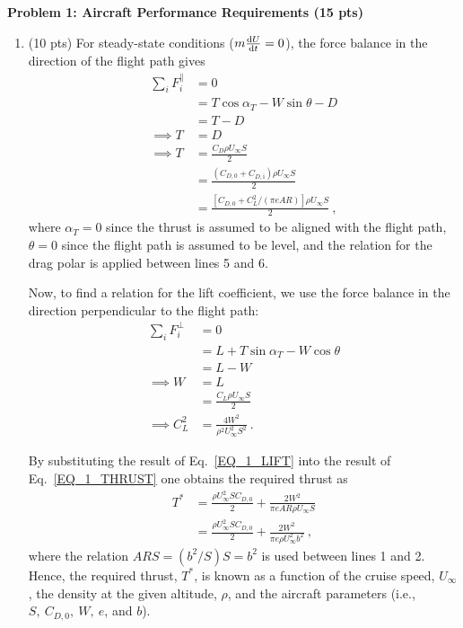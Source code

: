 \documentclass[12pt]{article}
\begin{document}
\textbf{Problem 1: Aircraft Performance Requirements (15 pts)}
\begin{enumerate}[label=(\alph*)]
	\item (10 pts)
		For steady-state conditions ($m\frac{\textup d U}{\textup d t} =0$), the force balance in the direction of the flight path gives
		\begin{equation}
			\label{EQ_1_THRUST}
			\begin{aligned}
				\sum_i F_i^{\parallel}&=0 \\
				 &=T\cos{\alpha_T} -W\sin{\theta} -D \\
				 &=T-D \\
				 \implies T&=D \\
				 \implies T&=\frac{C_D\rho U_\infty S}{2} \\
				 &=\frac{(C_{D,0}+C_{D,\mathrm{i}})\rho U_\infty S}{2} \\
				 &=\frac{[C_{D,0}+C_L^2/(\pi e AR)]\rho U_\infty S}{2}\ ,
			\end{aligned}	
		\end{equation}
		where $\alpha_T=0$ since the thrust is assumed to be aligned with the flight path, $\theta=0$ since the flight path is assumed to be level, and the relation for the drag polar is applied between lines 5 and 6.
		
		Now, to find a relation for the lift coefficient, we use the force balance in the direction perpendicular to the flight path:
		\begin{equation}
			\label{EQ_1_LIFT}
			\begin{aligned}
				\sum_i F_i^{\perp}&=0 \\
				&=L+T\sin{\alpha_T} -W\cos{\theta} \\
				&=L-W \\
				\implies W&=L \\ 
				&=\frac{C_L\rho U_\infty S}{2} \\
				\implies C_L^2&=\frac{4W^2}{\rho^2U_\infty^2S^2}\ .
			\end{aligned}	
		\end{equation}
		
		By substituting the result of Eq.~\ref{EQ_1_LIFT} into the result of Eq.~\ref{EQ_1_THRUST} one obtains the required thrust as  
		\begin{equation}
			\begin{aligned}
				T^*&=\frac{\rho U_\infty^2SC_{D,0}}{2}+\frac{2W^2}{\pi e AR\rho U_\infty S} \\
				&=\boxed{\frac{\rho U_\infty^2SC_{D,0}}{2}+\frac{2W^2}{\pi e \rho U_\infty^2 b^2}}\ ,
			\end{aligned}	
		\end{equation} 
		where the relation $ARS=(b^2/S)S=b^2$ is used between lines 1 and 2. Hence, the required thrust, $T^*$, is known as a function of the cruise speed, $U_\infty$, the density at the given altitude, $\rho$, and the aircraft parameters (i.e., $S,\ C_{D,0},\ W,\ e$, and $b$).
		

\end{enumerate}
\end{document}
